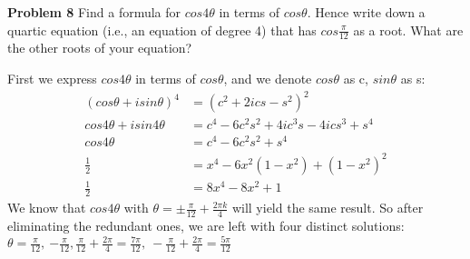 \documentclass[12pt,letterpaper]{hmcpset}
\begin{document}
\begin{problem}\textbf{Problem 8}
Find a formula for $cos4\theta$ in terms of $cos\theta$. Hence write down a quartic equation (i.e., an equation of degree 4) that has $cos\frac{\pi}{12}$ as a root. What are the other roots of your equation?
\end{problem}

\begin{solution}
First we express $cos4\theta$ in terms of $cos\theta$, and we denote $cos\theta$ as c, $sin\theta$ as s:
\begin{align*}
(cos\theta + isin\theta)^{4}	&= (c^{2}+2ics-s^{2})^{2}	\\
cos4\theta + isin4\theta		&= c^{4}-6c^{2}s^{2} + 4ic^{3}s - 4ics^{3} + s^{4}	\\
cos4\theta	&= c^{4} - 6c^{2}s^{2} + s^{4}  \\
\frac{1}{2}	&= x^{4} - 6x^{2}(1-x^{2})+(1-x^{2})^{2}	\\
\frac{1}{2}	&= 8x^{4} - 8x^{2} + 1
\end{align*}We know that $cos4\theta$ with $\theta = \pm\frac{\pi}{12} + \frac{2\pi k}{4}$ will yield the same result. So after eliminating the redundant ones, we are left with four distinct solutions: \newline$\theta=\boxed{\frac{\pi}{12}},\ \boxed{-\frac{\pi}{12}}, \frac{\pi}{12} + \frac{2\pi}{4} = \boxed{\frac{7\pi}{12}},\ -\frac{\pi}{12}+\frac{2\pi}{4}=\boxed{\frac{5\pi}{12}}$
\end{solution}


\end{document}
